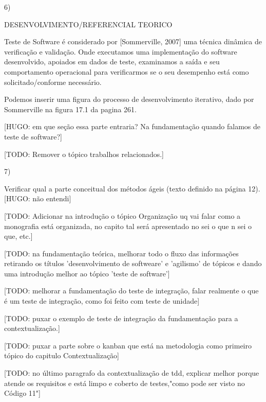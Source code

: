 6)

  DESENVOLVIMENTO/REFERENCIAL TEORICO

  Teste de Software é considerado por [Sommerville, 2007] uma técnica dinâmica de verificação e validação. Onde executamos uma implementação do software desenvolvido, apoiados em dados de teste, examinamos a saída e seu comportamento operacional para verificarmos se o seu desempenho está como solicitado/conforme necessário.

  Podemos inserir uma figura do processo de desenvolvimento iterativo, dado por Sommerville na figura 17.1 da pagina 261.

  [HUGO: em que seção essa parte entraria? Na fundamentação quando falamos de teste de software?]

  [TODO: Remover o tópico trabalhos relacionados.]


7)

  Verificar qual a parte conceitual dos métodos ágeis (texto definido na página 12). [HUGO: não entendi]


[TODO: Adicionar na introdução o tópico Organização uq vai falar como a monografia está organizada, no capito tal será apresentado no sei o que n sei o que, etc.]


[TODO: na fundamentação teórica, melhorar todo o fluxo das informações retirando os títulos 'desenvolvimento de softweare' e 'agilismo' de tópicos e dando uma introdução melhor ao tópico 'teste de software']

[TODO: melhorar a fundamentação do teste de integração, falar realmente o que é um teste de integração, como foi feito com teste de unidade]

[TODO: puxar o exemplo de teste de integração da fundamentação para a contextualização.]

[TODO: puxar a parte sobre o kanban que está na metodologia como primeiro tópico do capitulo Contextualização]

[TODO: no último paragrafo da contextualização de tdd, explicar melhor porque atende os requisitos e está limpo e coberto de testes,"como pode ser visto no Código 11"]